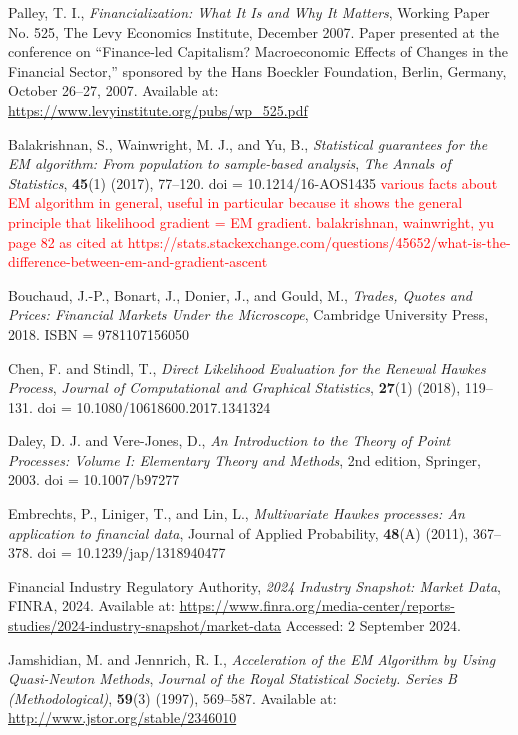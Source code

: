 \documentclass[honours,12pt]{unswthesis}
\numberwithin{equation}{section}
\begin{document}
\begin{thebibliography}{999}

Palley, T. I.,
\textit{Financialization: What It Is and Why It Matters},
Working Paper No. 525, The Levy Economics Institute, December 2007.
Paper presented at the conference on “Finance-led Capitalism? Macroeconomic Effects of Changes in the Financial Sector,” sponsored by the Hans Boeckler Foundation, Berlin, Germany, October 26–27, 2007.
Available at: \url{https://www.levyinstitute.org/pubs/wp\_525.pdf}

Balakrishnan, S., Wainwright, M. J., and Yu, B.,
\textit{Statistical guarantees for the EM algorithm: From population to sample-based analysis},
\textit{The Annals of Statistics},
\textbf{45}(1) (2017), 77--120.
doi = {10.1214/16-AOS1435}
\textcolor{red}{various facts about EM algorithm in general, useful in particular because it shows the general principle that likelihood gradient = EM gradient. balakrishnan, wainwright, yu page 82 as cited at https://stats.stackexchange.com/questions/45652/what-is-the-difference-between-em-and-gradient-ascent}

Bouchaud, J.-P., Bonart, J., Donier, J., and Gould, M.,
\textit{Trades, Quotes and Prices: Financial Markets Under the Microscope},
Cambridge University Press, 2018.
ISBN = {9781107156050}

Chen, F. and Stindl, T.,
\textit{Direct Likelihood Evaluation for the Renewal Hawkes Process},
\textit{Journal of Computational and Graphical Statistics},
\textbf{27}(1) (2018), 119--131.
doi = {10.1080/10618600.2017.1341324}

Daley, D. J. and Vere-Jones, D.,
\textit{An Introduction to the Theory of Point Processes: Volume I: Elementary Theory and Methods}, 2nd edition,
Springer, 2003.
doi = {10.1007/b97277}

Embrechts, P., Liniger, T., and Lin, L.,
\textit{Multivariate Hawkes processes: An application to financial data},
Journal of Applied Probability, \textbf{48}(A) (2011), 367--378.
doi = {10.1239/jap/1318940477}

Financial Industry Regulatory Authority,
\textit{2024 Industry Snapshot: Market Data},
FINRA, 2024.
Available at: \url{https://www.finra.org/media-center/reports-studies/2024-industry-snapshot/market-data}
Accessed: 2 September 2024.

Jamshidian, M. and Jennrich, R. I.,
\textit{Acceleration of the EM Algorithm by Using Quasi-Newton Methods},
\textit{Journal of the Royal Statistical Society. Series B (Methodological)},
\textbf{59}(3) (1997), 569--587.
Available at: \url{http://www.jstor.org/stable/2346010}


\end{thebibliography}
\end{document}
